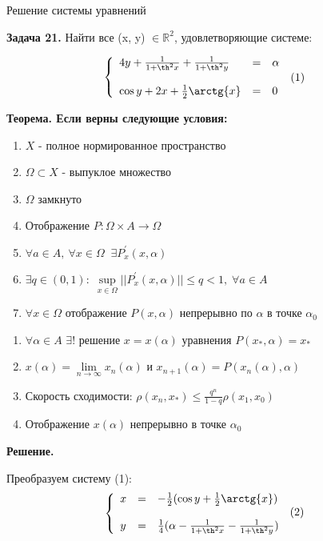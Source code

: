 \documentclass[a4paper, 12pt]{article}
\begin{document}
\begin{center} \huge
Решение системы уравнений
\end{center}
\textbf{
Задача 21.
}
Найти все (x, y) $\in \mathbb{R}^2 $, удовлетворяющие системе:

$$
\left\{
\begin{array} {l c l r}
4y + \frac{1}{1+\th^2{x}} + \frac{1}{1+\th^2{y}} &= &\alpha &\\
&&& (1) \\
\cos{y} + 2x + \frac{1}{2}\arctg{x}&= &0&
\end{array}
\right.
$$
\newline
\begin{text} \bf
\textbf{
Теорема.
}
Если верны следующие условия:
\end{text}
\begin{enumerate}
\item $X$ - полное нормированное пространство
\item $\Omega \subset X$ - выпуклое множество
\item $\Omega$ замкнуто
\item Отображение $ P:\Omega\times A \to \Omega$ 
\item $\forall a \in A, \: \forall x \in \Omega \;\; \exists P^{'}_x(x, \alpha)$
\item $\exists q \in (0, 1): \; \underset{x \in \Omega}{\sup} ||P^{'}_x(x, \alpha)|| \leq q < 1, \;\forall a \in A$
\item $\forall x \in \Omega$ отображение $P(x, \alpha)$ непрерывно по $\alpha$ в точке $\alpha_0$
\end{enumerate}
\begin{enumerate}
\item $\forall \alpha \in A$ $\exists!$ решение $x = x(\alpha)$ уравнения $P(x_*, \alpha) = x_*$
\item $x(\alpha) = \underset{{n\to \infty}}{\lim}x_n(\alpha)$ и $x_{n+1}(\alpha) = P(x_n(\alpha), \alpha)$
\item Скорость сходимости: $\rho(x_n, x_*) \le \frac{q^{n}}{1-q} \rho(x_1, x_0)$
\item Отображение $x(\alpha)$ непрерывно в точке $\alpha_0$
\end{enumerate}

\begin{text} \bf
\newline
\textbf{Решение.}
\end{text}
Преобразуем систему (1):
$$
\left\{
\begin{array} {l c l r}
x &= & - \frac{1}{2}(\cos{y}+\frac{1}{2}\arctg{x}) &\\
&&& (2) \\
y &= &\frac{1}{4}(\alpha - \frac{1}{1+\th^2{x}} - \frac{1}{1+\th^2{y}})&
\end{array}
\right.
$$
\end{document}
